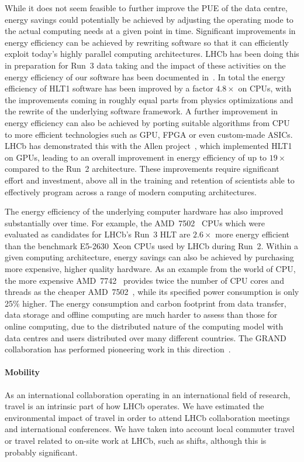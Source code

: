 \documentclass[../SustainableHEP.tex]{subfiles}
\begin{document}
\begin{casestudy}
While it does not seem feasible to further improve the PUE of the data centre, energy savings could potentially be achieved by adjusting the operating mode to the actual computing needs at a given point in time.  Significant improvements in energy efficiency can be achieved by rewriting software so that it can efficiently exploit today's highly parallel computing architectures. LHCb has been doing this in preparation for Run~3 data taking and the impact of these activities on the energy efficiency of our software has been documented in~\cite{hlt1-energy-eff}. In total the energy efficiency of HLT1 software has been improved by a factor $4.8\times$ on CPUs, with the improvements coming in roughly equal parts from physics optimizations and the rewrite of the underlying software framework. A further improvement in energy efficiency  can also be achieved by porting suitable algorithms from CPU to more efficient technologies such as GPU, FPGA or even custom-made ASICs. LHCb has demonstrated this with the Allen project~\cite{Allen}, which implemented HLT1 on GPUs, leading to an overall improvement in energy efficiency of up to $19\times$ compared to the Run~2 architecture. These improvements require significant effort and investment, above all in the training and retention of scientists able to effectively program across a range of modern computing architectures. 

The energy efficiency of the underlying computer hardware has also improved substantially over time. For example, the
AMD~7502~\cite{AMD7502} CPUs which were evaluated as candidates for LHCb's Run~3 HLT are $2.6\times$ more energy efficient than 
the benchmark E5-2630~Xeon CPUs used by LHCb during Run~2. 
Within a given computing architecture, energy savings can also be achieved by purchasing more expensive, higher quality hardware. 
As an example from the world of CPU, the more expensive AMD~7742~\cite{AMD7742}
provides twice the number of CPU cores and threads as the cheaper AMD~7502~\cite{AMD7502},
while its specified power consumption is only 25\% higher. The energy consumption and carbon footprint from data transfer, data storage and offline computing are much harder to assess than those for online computing, due to the distributed nature of the computing model with data centres and users distributed over many different countries. The GRAND collaboration has performed pioneering work in this direction~\cite{GRAND}.

\paragraph{Mobility}
As an international collaboration operating in an international field of research, travel is an intrinsic part of how LHCb operates. We have estimated the environmental impact of travel in order to attend LHCb collaboration meetings and international conferences. We have taken into account local commuter travel or travel related to on-site work at LHCb, such as shifts, although this is probably significant.


\end{casestudy}
\end{document}
